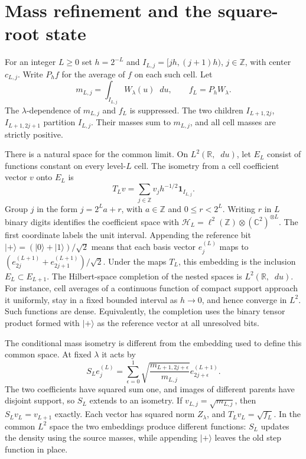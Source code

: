\documentclass[11pt]{article}
\newcommand{\R}{\mathbb R}
\newcommand{\dd}{\mathop{}\!d}
\begin{document}
\section{Mass refinement and the square-root state}\label{sec:refinement}

For an integer \(L\ge0\) set \(h=2^{-L}\) and
\(I_{L,j}=[jh,(j+1)h)\), \(j\in\mathbb Z\), with center \(c_{L,j}\).
Write \(P_h f\) for the average of \(f\) on each such cell.
Let
\[
 m_{L,j}=\int_{I_{L,j}} W_\lambda(u)\dd u,\qquad
 f_L=P_h W_\lambda .
\]
The \(\lambda\)-dependence of \(m_{L,j}\) and \(f_L\) is suppressed.
The two children \(I_{L+1,2j}\), \(I_{L+1,2j+1}\) partition
\(I_{L,j}\). Their masses sum to \(m_{L,j}\), and all cell masses
are strictly positive.

There is a natural space for the common limit. On \(L^2(\R,\dd u)\),
let \(E_L\) consist of functions constant on every level-\(L\) cell.
The isometry from a cell coefficient vector \(v\) onto \(E_L\) is
\[
 T_L v=\sum_{j\in\mathbb Z}v_j h^{-1/2}\mathbf 1_{I_{L,j}} .
\]
Group \(j\) in the form \(j=2^L a+r\), with \(a\in\mathbb Z\) and
\(0\le r<2^L\). Writing \(r\) in \(L\) binary digits identifies the
coefficient space with
\(\mathcal H_L=\ell^2(\mathbb Z)\otimes(\mathbb C^2)^{\otimes L}\).
The first coordinate labels the unit interval. Appending the
reference bit \(\lvert+\rangle=(\lvert0\rangle+\lvert1\rangle)/\sqrt2\)
means that each basis vector \(e_j^{(L)}\) maps to
\((e_{2j}^{(L+1)}+e_{2j+1}^{(L+1)})/\sqrt2\).
Under the maps \(T_L\), this embedding is the inclusion
\(E_L\subset E_{L+1}\). The Hilbert-space completion of the nested
spaces is \(L^2(\R,\dd u)\). For instance, cell averages of a
continuous function of compact support approach it uniformly, stay
in a fixed bounded interval as \(h\to0\), and hence converge in
\(L^2\). Such functions are dense. Equivalently, the completion
uses the binary tensor product formed with \(\lvert+\rangle\)
as the reference vector at all unresolved bits.

The conditional mass isometry is different from the embedding used
to define this common space. At fixed \(\lambda\) it acts by
\begin{equation}\label{eq:mass-isometry}
 S_L e_j^{(L)}=\sum_{\epsilon=0}^1
       \sqrt{\frac{m_{L+1,2j+\epsilon}}{m_{L,j}}}
       e_{2j+\epsilon}^{(L+1)} .
\end{equation}
The two coefficients have squared sum one, and images of different
parents have disjoint support, so \(S_L\) extends to an isometry.
If \(v_{L,j}=\sqrt{m_{L,j}}\), then \(S_L v_L=v_{L+1}\) exactly.
Each vector has squared norm \(Z_\lambda\), and
\(T_L v_L=\sqrt{f_L}\). In the common \(L^2\) space the two
embeddings produce different functions: \(S_L\) updates the
density using the source masses, while appending
\(\lvert+\rangle\) leaves the old step function in place.
\end{document}
